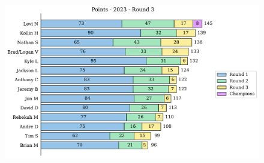\documentclass[10pt]{article}
\begin{document}
%
\begin{minipage}[t]{13cm}
    \vspace{0pt}
    \begin{figure}[H]
        \vspace{-1cm}
        \includegraphics[width=12cm,height=8cm,keepaspectratio]{../../figures/2023/Points-2023-Round3.pdf}
    \end{figure}
\end{minipage}
\end{document}

